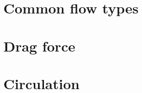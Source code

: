 \documentclass[12pt]{report}
\begin{document}
\chapter{Common flow types}



\chapter{Drag force}



\chapter{Circulation}




%


%


%

\end{document}
